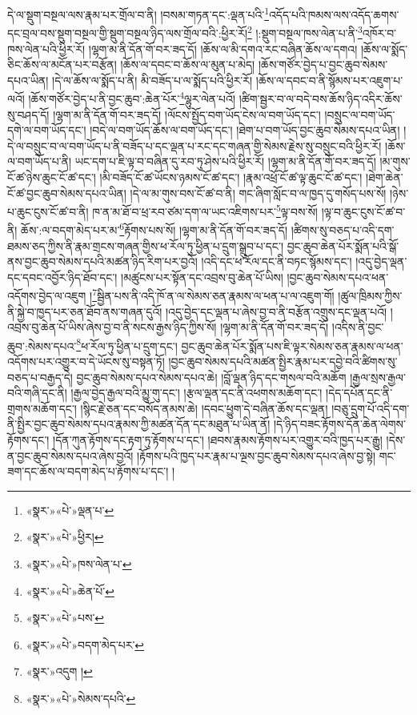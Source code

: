 དེ་ལ་སྡུག་བསྔལ་ལས་རྣམ་པར་གྲོལ་བ་ནི། །བསམ་གཏན་དང་:ལྡན་པའི་\footnote{«སྣར་»«པེ་»ལྡན་པ་}འདོད་པའི་ཁམས་ལས་འདོད་ཆགས་དང་བྲལ་བས་སྡུག་བསྔལ་གྱི་སྡུག་བསྔལ་ཉིད་ལས་གྲོལ་བའི་:ཕྱིར་རོ།\footnote{«སྣར་»«པེ་»ཕྱིར།} །:སྡུག་བསྔལ་ཁས་ལེན་པ་ནི་\footnote{«སྣར་»«པེ་»ཁས་ལེན་པ་}འཁོར་བ་ཁས་ལེན་པའི་ཕྱིར་རོ། །ལྷག་མ་ནི་དོན་གོ་བར་ཟད་དོ། །ཆོས་ལ་མི་དགའ་རང་བཞིན་ཆོས་ལ་དགའ། །ཆོས་ལ་སྨོད་ཅིང་ཆོས་ལ་མངོན་པར་བརྩོན། །ཆོས་ལ་དབང་བ་ཆོས་ལ་མུན་པ་མེད། །ཆོས་གཙོར་བྱེད་པ་བྱང་ཆུབ་སེམས་དཔའ་ཡིན། །དེ་ལ་ཆོས་ལ་སྨོད་པ་ནི། མི་བཟོད་པ་ལ་སྨོད་པའི་ཕྱིར་རོ། །ཆོས་ལ་དབང་བ་ནི་སྙོམས་པར་འཇུག་པ་ལའོ། །ཆོས་གཙོར་བྱེད་པ་ནི་བྱང་ཆུབ་:ཆེན་པོར་\footnote{«སྣར་»«པེ་»ཆེན་པོ་}ལྷུར་ལེན་པའོ། །ཚིག་སྦྱར་བ་ལ་བདེ་བས་ཆོས་ཉིད་འདིར་ཆོས་སུ་བཤད་དོ། །ལྷག་མ་ནི་དོན་གོ་བར་ཟད་དོ། །ལོངས་སྤྱོད་བག་ཡོད་ངེས་ལ་བག་ཡོད་དང་། །བསྲུང་ལ་བག་ཡོད་དགེ་ལ་བག་ཡོད་དང་། །བདེ་ལ་བག་ཡོད་ཆོས་ལ་བག་ཡོད་དང་། །ཐེག་པ་བག་ཡོད་བྱང་ཆུབ་སེམས་དཔའ་ཡིན། །དེ་ལ་བསྲུང་བ་ལ་བག་ཡོད་པ་ནི་བཟོད་པ་དང་ལྡན་པ་རང་དང་གཞན་གྱི་སེམས་རྗེས་སུ་བསྲུང་བའི་ཕྱིར་རོ། །ཆོས་ལ་བག་ཡོད་པ་ནི། ཡང་དག་པ་ཇི་ལྟ་བ་བཞིན་དུ་རབ་ཏུ་ཤེས་པའི་ཕྱིར་རོ། །ལྷག་མ་ནི་དོན་གོ་བར་ཟད་དོ། །མ་གུས་ངོ་ཚ་ཉེས་ཆུང་ངོ་ཚ་དང་། །མི་བཟོད་ངོ་ཚ་ཡོངས་ཉམས་ངོ་ཚ་དང་། །རྣམ་འཕྲོ་ངོ་ཚ་ལྟ་ཆུང་ངོ་ཚ་དང་། །ཐེག་ཆེན་ངོ་ཚ་བྱང་ཆུབ་སེམས་དཔའ་ཡིན། །དེ་ལ་མ་གུས་བས་ངོ་ཚ་བ་ནི། གང་ཞིག་སློང་བ་ལ་ཁྱད་དུ་གསོད་པས་སོ། །ཉེས་པ་ཆུང་ངུས་ངོ་ཚ་བ་ནི། ཁ་ན་མ་ཐོ་བ་ཕྲ་རབ་ཙམ་དག་ལ་ཡང་འཇིགས་པར་\footnote{«སྣར་»«པེ་»པས་}ལྟ་བས་སོ། །ལྟ་བ་ཆུང་ངུས་ངོ་ཚ་བ་ནི། ཆོས་:ལ་བདག་མེད་པར་མ་\footnote{«སྣར་»«པེ་»བདག་མེད་པར་}རྟོགས་པས་སོ། །ལྷག་མ་ནི་དོན་གོ་བར་ཟད་དོ། །ཚིགས་སུ་བཅད་པ་འདི་དག་ཐམས་ཅད་ཀྱིས་ནི་རྣམ་གྲངས་གཞན་གྱིས་ཕ་རོལ་ཏུ་ཕྱིན་པ་དྲུག་སྒྲུབ་པ་དང་། བྱང་ཆུབ་ཆེན་པོར་སྨོན་པའི་སྒོ་ནས་བྱང་ཆུབ་སེམས་དཔའི་མཚན་ཉིད་རིག་པར་བྱའོ། །འདི་དང་ཕ་རོལ་དང་ནི་བཏང་སྙོམས་དང་། །འདུ་བྱེད་ལྡན་དང་དབང་འབྱོར་ཉིད་ཐོབ་དང་། །མཚུངས་པར་སྟོན་དང་འབྲས་བུ་ཆེན་པོ་ཡིས། །བྱང་ཆུབ་སེམས་དཔའ་ཕན་འདོགས་བྱེད་ལ་འཇུག །\footnote{«སྣར་»འདུག །}སྦྱིན་པས་ནི་འདི་ཁོ་ན་ལ་སེམས་ཅན་རྣམས་ལ་ཕན་པ་ལ་འཇུག་གོ། །ཚུལ་ཁྲིམས་ཀྱིས་ནི་སྐྱེ་བ་ཁྱད་པར་ཅན་ཐོབ་ནས་གཞན་དུའོ། །འདུ་བྱེད་དང་ལྡན་པ་ཞེས་བྱ་བ་ནི་བརྩོན་འགྲུས་དང་ལྡན་པའོ། །འབྲས་བུ་ཆེན་པོ་ཡིས་ཞེས་བྱ་བ་ནི་སངས་རྒྱས་ཉིད་ཀྱིས་སོ། །ལྷག་མ་ནི་དོན་གོ་བར་ཟད་དོ། །འདིས་ནི་བྱང་ཆུབ་:སེམས་དཔའ་\footnote{«སྣར་»«པེ་»སེམས་དཔའི་}ཕ་རོལ་ཏུ་ཕྱིན་པ་དྲུག་དང་། བྱང་ཆུབ་ཆེན་པོར་སྨོན་པས་ཇི་ལྟར་སེམས་ཅན་རྣམས་ལ་ཕན་འདོགས་པར་འགྱུར་བ་དེ་ཡོངས་སུ་བསྟན་ཏོ། །བྱང་ཆུབ་སེམས་དཔའི་མཚན་སྤྱིར་རྣམ་པར་དབྱེ་བའི་ཚིགས་སུ་བཅད་པ་བརྒྱད་དེ། བྱང་ཆུབ་སེམས་དཔའ་སེམས་དཔའ་ཆེ། །བློ་ལྡན་ཉིད་དང་གསལ་བའི་མཆོག །རྒྱལ་སྲས་རྒྱལ་བའི་གཞི་དང་ནི། །རྒྱལ་བྱེད་རྒྱལ་བའི་མྱུ་གུ་དང་། །རྩལ་ལྡན་དང་ནི་འཕགས་མཆོག་དང་། །དེད་དཔོན་དང་ནི་གྲགས་མཆོག་དང་། །སྙིང་རྗེ་ཅན་དང་བསོད་ནམས་ཆེ། །དབང་ཕྱུག་དེ་བཞིན་ཆོས་དང་ལྡན། །བཅུ་དྲུག་པོ་འདི་དག་ནི་སྤྱིར་བྱང་ཆུབ་སེམས་དཔའ་རྣམས་ཀྱི་མཚན་དོན་དང་མཐུན་པ་ཡིན་ནོ། །དེ་ཉིད་བཟང་རྟོགས་དོན་ཆེན་ལེགས་རྟོགས་དང་། །དོན་ཀུན་རྟོགས་དང་རྟག་ཏུ་རྟོགས་པ་དང་། །ཐབས་རྣམས་རྟོགས་པར་འགྱུར་བའི་ཁྱད་པར་རྒྱུ། །དེས་ན་བྱང་ཆུབ་སེམས་དཔའ་ཞེས་བྱའོ། །རྟོགས་པའི་ཁྱད་པར་རྣམ་པ་ལྔས་བྱང་ཆུབ་སེམས་དཔའ་ཞེས་བྱ་སྟེ། གང་ཟག་དང་ཆོས་ལ་བདག་མེད་པ་རྟོགས་པ་དང་། །
